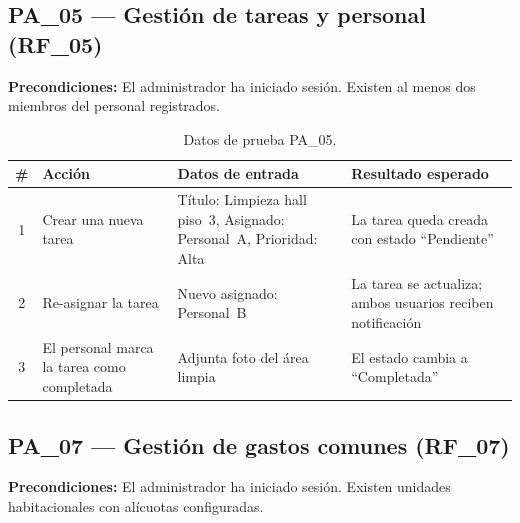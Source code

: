 \subsection{PA\_05 — Gestión de tareas y personal (RF\_05)}

\textbf{Precondiciones:} El administrador ha iniciado sesión. Existen al menos dos miembros del personal registrados.

\begin{table}[H]
\centering
\small
\begin{tabular}{|c|p{}|p{}|p{}|}
\hline
\textbf{\#} & \textbf{Acción} & \textbf{Datos de entrada} & \textbf{Resultado esperado} \\ \hline
1 & Crear una nueva tarea & Título: Limpieza hall piso~3, Asignado: Personal~A, Prioridad: Alta & La tarea queda creada con estado ``Pendiente'' \\ \hline
2 & Re-asignar la tarea & Nuevo asignado: Personal~B & La tarea se actualiza; ambos usuarios reciben notificación \\ \hline
3 & El personal marca la tarea como completada & Adjunta foto del área limpia & El estado cambia a ``Completada'' \\ \hline
\end{tabular}
\caption{Datos de prueba PA\_05.}
\end{table}

\subsection{PA\_07 — Gestión de gastos comunes (RF\_07)}

\textbf{Precondiciones:} El administrador ha iniciado sesión. Existen unidades habitacionales con alícuotas configuradas.


